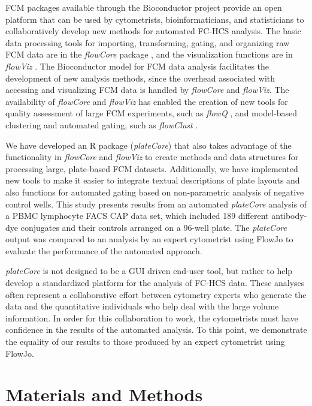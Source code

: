 \documentclass[12pt]{article}
\newcommand{\Rpackage}[1]{{\textit{#1}}}
\begin{document}
FCM packages available through the Bioconductor \citep{BIOC} project provide an
open platform that can be used by cytometrists, bioinformaticians, and
statisticians to collaboratively develop new methods for automated FC-HCS
analysis. The basic data processing tools for importing, transforming, gating,
and organizing raw FCM data are in the \Rpackage{flowCore} package
\citep{hahne2009}, and the visualization functions are in \Rpackage{flowViz}
\citep{sarkar2008ufv}. The Bioconductor model for FCM data analysis facilitates
the development of new analysis methods, since the overhead associated with
accessing and visualizing FCM data is handled by \Rpackage{flowCore} and
\Rpackage{flowViz}. The availability of \Rpackage{flowCore} and
\Rpackage{flowViz} has enabled the creation of new tools for quality assessment
of large FCM experiments, such as \Rpackage{flowQ} \citep{lemeurFQ}, and
model-based clustering and automated gating, such as \Rpackage{flowClust}
\citep{lo2008}.

We have developed an R package (\Rpackage{plateCore}) that also takes advantage
of the functionality in \Rpackage{flowCore} and \Rpackage{flowViz} to create
methods and data structures for processing large, plate-based FCM datasets.
Additionally, we have implemented new tools to make it easier to integrate
textual descriptions of plate layouts and also functions for automated gating
based on non-parametric analysis of negative control wells. This study presents
results from an automated \Rpackage{plateCore} analysis of a PBMC lymphocyte
FACS CAP data set, which included 189 different antibody-dye conjugates
and their controls arranged on a 96-well plate. The \Rpackage{plateCore} output
was compared to an analysis by an expert cytometrist using FlowJo to evaluate
the performance of the automated approach.

\Rpackage{plateCore} is not designed to be a GUI driven end-user tool, but
rather to help develop a standardized platform for the analysis of FC-HCS data.
These analyses often represent a collaborative effort between cytometry experts
who generate the data and the quantitative individuals who help deal with the
large volume information. In order for this collaboration to work, the
cytometrists must have confidence in the results of the automated analysis. To
this point, we demonstrate the equality of our results to those produced by an
expert cytometrist using FlowJo.

\clearpage
\section*{Materials and Methods}
\end{document}
